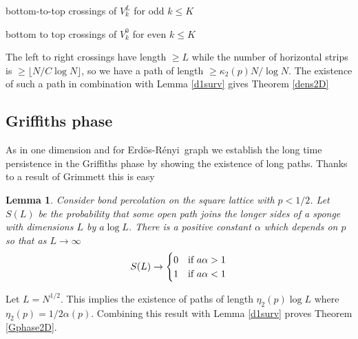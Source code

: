 \documentclass[11pt]{article}
\def\clearp{}
\newtheorem{lemma}{Lemma}[section]
\theoremstyle{definition}
\def\mn{\medskip\noindent}
\def\ER{Erd\"os-R\'enyi\ }
\begin{document}
bottom-to-top crossings of  $V^L_k$ for odd $k \le K$

bottom to top crossings of  $V^0_k$ for even $k\le K$


\mn
The left to right crossings have length $\ge L$ while the number of horizontal strips is
$\ge \lfloor N/C \log N \rfloor$, so we have a path of length $\ge \kappa_2(p)N/\log N$. The existence of such a path in combination with Lemma \ref{d1surv} gives
Theorem \ref{dens2D}

\subsection{Griffiths phase} 

As in one dimension and for  \ER graph we establish the long time persistence in the Griffiths phase by showing the existence of long paths. Thanks to a result of Grimmett \cite{Gri81} this is easy

\begin{lemma} \label{Gr1981}
Consider bond percolation on the square lattice with $p<1/2$. Let $S(L)$ be the probability that some open path joins the longer sides of a sponge with dimensions $L$ by $a \log L$.  There is a positive constant $\alpha$ which depends on $p$ so that as $L\to\infty$
$$
S(L) \to \begin{cases} 0 & \hbox{if $a\alpha>1$}\\ 
1 & \hbox{if $a\alpha<1$}
\end{cases}
$$
\end{lemma}

\noindent
Let $L=N^{1/2}$. This implies the existence of paths of length $\eta_2(p) \log L$ where $\eta_2(p) =  1/2\alpha(p)$. Combining this result with Lemma \ref{d1surv} proves Theorem \ref{Gphase2D}.

\clearp
\end{document}
